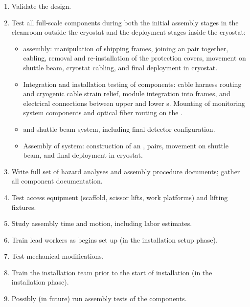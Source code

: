 \begin{enumerate}
\item Validate the  design. 
\item Test all full-scale  components during both the initial assembly stages in the cleanroom outside the cryostat and the deployment stages inside the cryostat:  
\begin{itemize}
    \item {}  assembly: manipulation of  shipping frames, joining an  pair together,  cabling, removal and re-installation of the  protection covers, movement on shuttle beam, cryostat cabling, and final deployment in cryostat. 
    \item Integration and installation testing of  components: cable harness routing and cryogenic cable strain relief, module integration into  frames, and electrical connections between upper and lower s.   Mounting of  monitoring system components and optical fiber routing on the . %
    \item {} and shuttle beam system, including final detector configuration.
    \item Assembly of  system: construction of an , %
     pairs, movement on shuttle beam, and final deployment in cryostat.
\end{itemize}
\item Write full set of hazard analyses and assembly procedure documents; %
gather all component documentation. 
\item Test access equipment (scaffold, scissor lifts, work platforms) and lifting fixtures. 
\item Study assembly time and motion, including labor estimates. 
\item Train lead workers as  begins set up (in the installation setup phase).
\item Test mechanical modifications.
\item Train the installation team prior to the start of  installation (in the installation phase). 
\item Possibly (in future) run assembly tests of the  components.
\end{enumerate}


